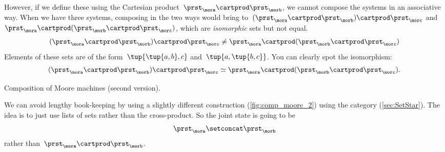 However, if we define these using the Cartesian product~$\prst_{\mora} \cartprod \prst_{\morb}$, we cannot compose the systems in an associative way.
When we have three systems, composing in the two ways would bring to~$(\prst_{\mora} \cartprod \prst_{\morb}) \cartprod \prst_{\morc}$ and~$\prst_{\mora} \cartprod (\prst_{\morb} \cartprod \prst_{\morc})$, which are \emph{isomorphic} sets but not equal.
%
\begin{equation}
    \label{eq:assoc-fails1}
    (\prst_{\mora} \cartprod \prst_{\morb}) \cartprod \prst_{\morc} \neq \prst_{\mora} \cartprod (\prst_{\morb} \cartprod \prst_{\morc})
\end{equation}
Elements of these sets are of the form~$\tup{\tup{a,b},c}$ and~$\tup{a, \tup{b,c}}$.
%
You can clearly spot the isomorphism:
%
\begin{equation}
    \label{eq:assoc-fails2}
    (\prst_{\mora} \cartprod \prst_{\morb}) \cartprod \prst_{\morc} \simeq \prst_{\mora} \cartprod (\prst_{\morb} \cartprod \prst_{\morc}).
\end{equation}
%

\begin{marginfigure}
    \centering
    \caption{Composition of Moore machines (second version).}
    \label{fig:comp_moore_2}
\end{marginfigure}

We can avoid lengthy book-keeping by using a slightly different construction (\cref{fig:comp_moore_2}) using the \SetStar category (\cref{sec:SetStar}).
%
The idea is to just use lists of sets rather than the cross-product.
So the joint state is going to be
\begin{equation}
    \label{eq:moore-comp-good-joint}
    \prst_{\mora} \setconcat \prst_{\morb}
\end{equation}
rather than~$\prst_{\mora} \cartprod \prst_{\morb}$.

